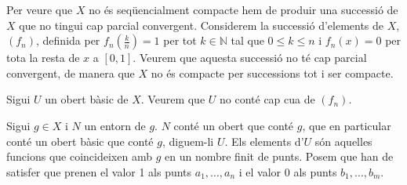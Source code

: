 \documentclass[12pt]{article}
\numberwithin{table}{section}
\numberwithin{figure}{section}
\numberwithin{equation}{section}
\newcommand{\N}{\mathbb{N}}
\begin{document}
Per veure que \( X \) no és seqüencialment compacte hem de produir una successió de \( X \) que no tingui cap parcial convergent. Considerem la successió d'elements de \( X \), \( (f_n) \), definida per \( f_n\left(\tfrac{k}{n}\right) = 1 \) per tot \( k \in \N \) tal que \( 0 \leq k \leq n \) i \( f_n(x) = 0 \) per tota la resta de \( x \) a \( [0,1] \). Veurem que aquesta successió no té cap parcial convergent, de manera que \( X \) no és compacte per successions tot i ser compacte.

Sigui \( U \) un obert bàsic de \( X \). Veurem que \( U \) no conté cap cua de \( (f_n) \). 

Sigui \( g \in X \) i \( N \) un entorn de \( g \). \( N \) conté un obert que conté \( g \), que en particular conté un obert bàsic que conté \( g \), diguem-li \( U \). Els elements d'\( U \) són aquelles funcions que coincideixen amb \( g \) en un nombre finit de punts. Posem que han de satisfer que prenen el valor 1 als punts \( a_1, \dots, a_n \) i el valor 0 als punts \( b_1, \dots, b_m \). 
\end{document}
